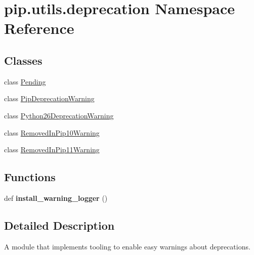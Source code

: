 \hypertarget{namespacepip_1_1utils_1_1deprecation}{}\section{pip.\+utils.\+deprecation Namespace Reference}
\label{namespacepip_1_1utils_1_1deprecation}
\subsection*{Classes}
\begin{DoxyCompactItemize}
\item 
class \hyperlink{classpip_1_1utils_1_1deprecation_1_1_pending}{Pending}
\item 
class \hyperlink{classpip_1_1utils_1_1deprecation_1_1_pip_deprecation_warning}{Pip\+Deprecation\+Warning}
\item 
class \hyperlink{classpip_1_1utils_1_1deprecation_1_1_python26_deprecation_warning}{Python26\+Deprecation\+Warning}
\item 
class \hyperlink{classpip_1_1utils_1_1deprecation_1_1_removed_in_pip10_warning}{Removed\+In\+Pip10\+Warning}
\item 
class \hyperlink{classpip_1_1utils_1_1deprecation_1_1_removed_in_pip11_warning}{Removed\+In\+Pip11\+Warning}
\end{DoxyCompactItemize}
\subsection*{Functions}
\begin{DoxyCompactItemize}
\item 
\mbox{\label{namespacepip_1_1utils_1_1deprecation_aebecdca01b2f785cc3d1ff1102ee0ec8}} 
def {\bfseries install\+\_\+warning\+\_\+logger} ()
\end{DoxyCompactItemize}


\subsection{Detailed Description}
\begin{DoxyVerb}A module that implements tooling to enable easy warnings about deprecations.
\end{DoxyVerb}
 